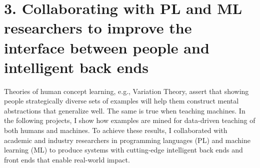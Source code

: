 \documentclass[justified]{tufte-handout}
\begin{document}




\section{3. Collaborating with PL and ML researchers to improve the interface between people and intelligent back ends}\label{sec:teaching}
Theories of human concept learning, e.g., Variation Theory,\cite{vt} assert that showing people strategically diverse sets of examples will help them construct mental abstractions that generalize well. The same is true when teaching machines. In the following projects, I show how examples are mined for data-driven teaching of both humans and machines. To achieve these results, I collaborated with academic and industry researchers in programming languages (PL) and machine learning (ML) to produce systems with cutting-edge intelligent back ends and front ends that enable real-world impact. %
\end{document}

